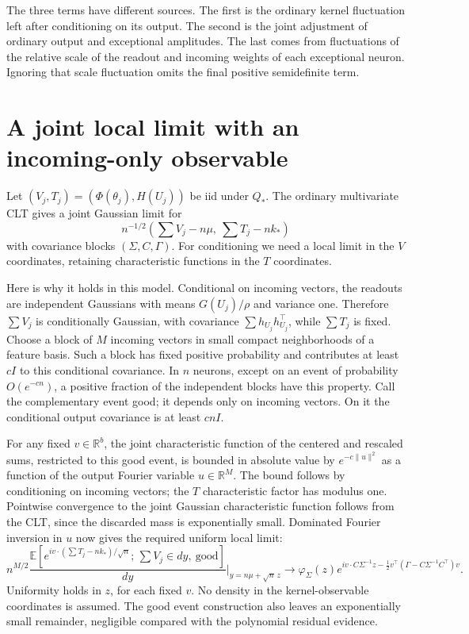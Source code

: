 \documentclass[11pt]{article}
\newcommand{\E}{\mathbb E}\newcommand{\R}{\mathbb R}
\begin{document}
The three terms have different sources. The first is the ordinary
kernel fluctuation left after conditioning on its output. The second
is the joint adjustment of ordinary output and exceptional amplitudes.
The last comes from fluctuations of the relative scale of the readout
and incoming weights of each exceptional neuron. Ignoring that scale
fluctuation omits the final positive semidefinite term.

\section{A joint local limit with an incoming-only observable}
Let $(V_j,T_j)=(\Phi(\theta_j),H(U_j))$ be iid under $Q_*$.
The ordinary multivariate CLT gives a joint Gaussian limit for
\[
 n^{-1/2}\left(\sum V_j-n\mu,\ \sum T_j-nk_*\right)
\]
with covariance blocks $(\Sigma,C,\Gamma)$. For conditioning we need
a local limit in the $V$ coordinates, retaining characteristic functions
in the $T$ coordinates.

Here is why it holds in this model. Conditional on incoming vectors,
the readouts are independent Gaussians with means $G(U_j)/\rho$ and
variance one. Therefore $\sum V_j$ is conditionally Gaussian, with
covariance $\sum h_{U_j}h_{U_j}^\top$, while $\sum T_j$ is fixed.
Choose a block of $M$ incoming vectors in small compact neighborhoods
of a feature basis. Such a block has fixed positive probability and
contributes at least $cI$ to this conditional covariance. In $n$ neurons,
except on an event of probability $O(e^{-cn})$, a positive fraction of
the independent blocks have this property. Call the complementary event
good; it depends only on incoming vectors. On it the conditional output
covariance is at least $cnI$.

For any fixed $v\in\R^b$, the joint characteristic function of the
centered and rescaled sums, restricted to this good event, is bounded
in absolute value by $e^{-c\|u\|^2}$ as a function of the output Fourier
variable $u\in\R^M$. The bound follows by conditioning on incoming
vectors; the $T$ characteristic factor has modulus one. Pointwise
convergence to the joint Gaussian characteristic function follows from
the CLT, since the discarded mass is exponentially small. Dominated
Fourier inversion in $u$ now gives the required uniform local limit:
\[
 n^{M/2}\frac{\E[e^{iv\cdot(\sum T_j-nk_*)/\sqrt n};\,
                    \sum V_j\in dy,\ \mathrm{good}]}{dy}
 \bigg|_{y=n\mu+\sqrt n\,z}
 \longrightarrow
 \varphi_\Sigma(z)
 e^{iv\cdot C\Sigma^{-1}z-\frac12v^\top
                  (\Gamma-C\Sigma^{-1}C^\top)v}.          \tag{2}
\]
Uniformity holds in $z$, for each fixed $v$. No density in the
kernel-observable coordinates is assumed. The good event construction
also leaves an exponentially small remainder, negligible compared with
the polynomial residual evidence.
\end{document}
